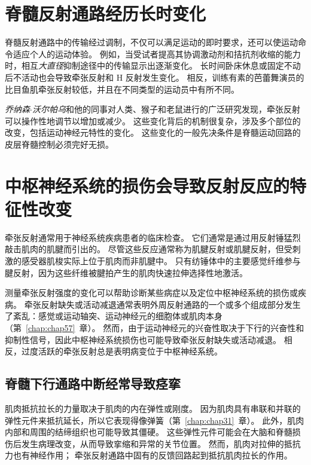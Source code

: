 \section{脊髓反射通路经历长时变化}

脊髓反射通路中的传输经过调制，不仅可以满足运动的即时要求，还可以使运动命令适应个人的运动体验。
例如，当受试者提高其协调激动剂和拮抗剂收缩的能力时，相互\textit{大直径}抑制途径中的传输显示出逐渐变化。
长时间卧床休息或固定不动后不活动也会导致牵张反射和 H 反射发生变化。
相反，训练有素的芭蕾舞演员的比目鱼肌牵张反射较低，并且在不同类型的运动员中有所不同。


\textit{乔纳森$\cdot$沃尔帕乌}和他的同事对人类、猴子和老鼠进行的广泛研究发现，牵张反射可以操作性地调节以增加或减少。
这些变化背后的机制很复杂，涉及多个部位的改变，包括运动神经元特性的变化。
这些变化的一般先决条件是脊髓运动回路的皮层脊髓控制必须完好无损。



\section{中枢神经系统的损伤会导致反射反应的特征性改变}

牵张反射通常用于神经系统疾病患者的临床检查。
它们通常是通过用反射锤猛烈敲击肌肉的肌腱而引出的。
尽管这些反应通常称为肌腱反射或肌腱反射，但受刺激的感受器肌梭实际上位于肌肉而非肌腱中。
只有纺锤体中的主要感觉纤维参与腱反射，因为这些纤维被腱拍产生的肌肉快速拉伸选择性地激活。


测量牵张反射强度的变化可以帮助诊断某些病症以及定位中枢神经系统的损伤或疾病。
牵张反射缺失或活动减退通常表明外周反射通路的一个或多个组成部分发生了紊乱：感觉或运动轴突、运动神经元的细胞体或肌肉本身（第~\ref{chap:chap57}~章）。
然而，由于运动神经元的兴奋性取决于下行的兴奋性和抑制性信号，因此中枢神经系统损伤也可能导致牵张反射缺失或活动减退。
相反，过度活跃的牵张反射总是表明病变位于中枢神经系统。



\subsection{脊髓下行通路中断经常导致痉挛}

肌肉抵抗拉长的力量取决于肌肉的内在弹性或刚度。
因为肌肉具有串联和并联的弹性元件来抵抗延长，所以它表现得像弹簧（第~\ref{chap:chap31}~章）。
此外，肌肉内部和周围的结缔组织也可能导致其僵硬。
这些弹性元件可能会在大脑和脊髓损伤后发生病理改变，从而导致挛缩和异常的关节位置。
然而，肌肉对拉伸的抵抗力也有神经作用；
牵张反射通路中固有的反馈回路起到抵抗肌肉拉长的作用。


